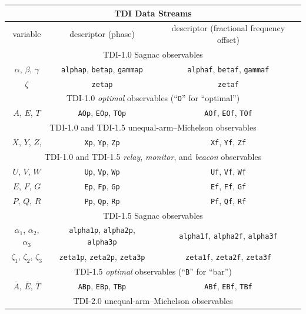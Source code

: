 \documentclass[11pt]{report}
\begin{document}
\begin{center}
\begin{tabular}{c|c|c}
\hline \hline
\multicolumn{3}{c}{{\bf TDI Data Streams}} \\
\hline
variable & descriptor (phase) & descriptor (fractional frequency offset) \\
\hline
\multicolumn{3}{c}{TDI-1.0 Sagnac observables} \\
$\alpha$, $\beta$, $\gamma$  & \texttt{alphap}, \texttt{betap}, \texttt{gammap} & \texttt{alphaf}, \texttt{betaf}, \texttt{gammaf} \\
$\zeta$  & \texttt{zetap}  & \texttt{zetaf} \\
\hline
\multicolumn{3}{c}{TDI-1.0 \emph{optimal} observables (``\texttt{O}'' for ``optimal'')} \\
$A$, $E$, $T$ & \texttt{AOp}, \texttt{EOp}, \texttt{TOp} & \texttt{AOf}, \texttt{EOf}, \texttt{TOf} \\
\hline
\multicolumn{3}{c}{TDI-1.0 and TDI-1.5 unequal-arm--Michelson observables} \\
$X$, $Y$, $Z$, & \texttt{Xp}, \texttt{Yp}, \texttt{Zp} & \texttt{Xf}, \texttt{Yf}, \texttt{Zf} \\
\hline
\multicolumn{3}{c}{TDI-1.0 and TDI-1.5 \emph{relay}, \emph{monitor}, and \emph{beacon} observables} \\
$U$, $V$, $W$ & \texttt{Up}, \texttt{Vp}, \texttt{Wp} & \texttt{Uf}, \texttt{Vf}, \texttt{Wf} \\
$E$, $F$, $G$ & \texttt{Ep}, \texttt{Fp}, \texttt{Gp} & \texttt{Ef}, \texttt{Ff}, \texttt{Gf} \\
$P$, $Q$, $R$ & \texttt{Pp}, \texttt{Qp}, \texttt{Rp} & \texttt{Pf}, \texttt{Qf}, \texttt{Rf} \\
\hline
\multicolumn{3}{c}{TDI-1.5 Sagnac observables} \\
$\alpha_1$, $\alpha_2$, $\alpha_3$ & \texttt{alpha1p}, \texttt{alpha2p}, \texttt{alpha3p} & \texttt{alpha1f}, \texttt{alpha2f}, \texttt{alpha3f} \\
$\zeta_1$, $\zeta_2$, $\zeta_3$  & \texttt{zeta1p}, \texttt{zeta2p}, \texttt{zeta3p}  & \texttt{zeta1f}, \texttt{zeta2f}, \texttt{zeta3f} \\
\hline
\multicolumn{3}{c}{TDI-1.5 \emph{optimal} observables (``\texttt{B}'' for ``bar'')} \\
$\bar{A}$, $\bar{E}$, $\bar{T}$ & \texttt{ABp}, \texttt{EBp}, \texttt{TBp} & \texttt{ABf}, \texttt{EBf}, \texttt{TBf} \\
\hline
\multicolumn{3}{c}{TDI-2.0 unequal-arm--Michelson observables} \\

\end{tabular}
\end{center}
\end{document}
